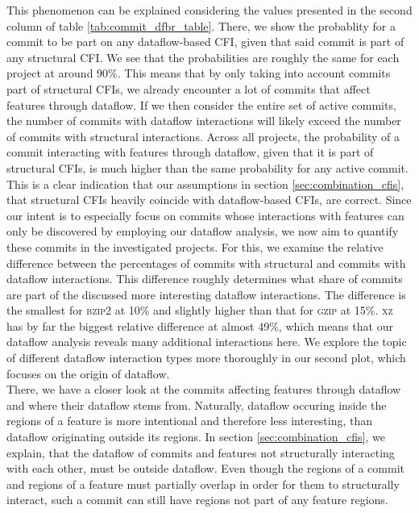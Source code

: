 This phenomenon can be explained considering the values presented in the second column of table \ref{tab:commit_dfbr_table}.
There, we show the probablity for a commit to be part on any dataflow-based CFI, given that said commit is part of any structural CFI.
We see that the probabilities are roughly the same for each project at around 90\%.
This means that by only taking into account commits part of structural CFIs, we already encounter a lot of commits that affect features through dataflow.
If we then consider the entire set of active commits, the number of commits with dataflow interactions will likely exceed the number of commits with structural interactions.
Across all projects, the probability of a commit interacting with features through dataflow, given that it is part of structural CFIs, is much higher than the same probability for any active commit.
This is a clear indication that our assumptions in section \ref{sec:combination_cfis}, that structural CFIs heavily coincide with dataflow-based CFIs, are correct.
Since our intent is to especially focus on commits whose interactions with features can only be discovered by employing our dataflow analysis, we now aim to quantify these commits in the investigated projects.
For this, we examine the relative difference between the percentages of commits with structural and commits with dataflow interactions.
This difference roughly determines what share of commits are part of the discussed more interesting dataflow interactions.
The difference is the smallest for \textsc{bzip2} at 10\% and slightly higher than that for \textsc{gzip} at 15\%.
\textsc{xz} has by far the biggest relative difference at almost 49\%, which means that our dataflow analysis reveals many additional interactions here.
We explore the topic of different dataflow interaction types more thoroughly in our second plot, which focuses on the \textsf{origin} of dataflow. \\
There, we have a closer look at the commits affecting features through dataflow and where their dataflow stems from.
Naturally, dataflow occuring inside the regions of a feature is more intentional and therefore less interesting, than dataflow originating outside its regions.
In section \ref{sec:combination_cfis}, we explain, that the dataflow of commits and features not structurally interacting with each other, must be outside dataflow.
Even though the regions of a commit and regions of a feature must partially overlap in order for them to structurally interact, such a commit can still have regions not part of any feature regions.
